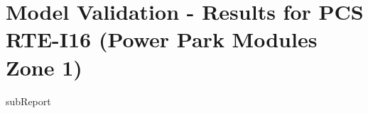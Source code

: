




    \section{Model Validation - Results for PCS RTE-I16 (Power Park Modules Zone 1)}

    {{subReport}}
    \newpage

